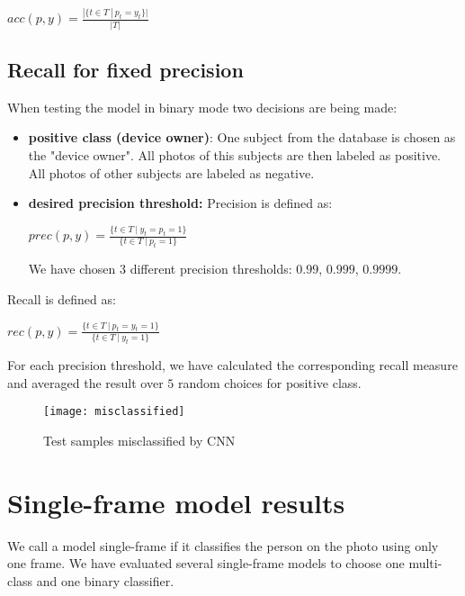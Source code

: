         \begin{center}
        $acc(p, y) = \frac{|\{t \in T\ |\ p_t = y_t\}|}{|T|}$
        \end{center}

        \subsection*{Recall for fixed precision}

        When testing the model in binary mode two decisions are being made:
        \begin{itemize}
            \item \textbf{positive class (device owner)}: One subject from the
            database is chosen as the "device owner". All photos of this subjects
            are then labeled as positive. All photos of other subjects are
            labeled as negative.
            \item \textbf{desired precision threshold:}
            Precision is defined as:
            \begin{center}
            $prec(p, y) = \frac{\{t \in T\ |\ y_t = p_t = 1\}}{\{t \in T\ |\ p_t = 1\}}$
            \end{center}
            We have chosen $3$ different precision thresholds: $0.99$, $0.999$, $0.9999$.
        \end{itemize}
        Recall is defined as:
        \begin{center}
        $rec(p, y) = \frac{\{t \in T\ |\ p_t = y_t = 1\}}{\{t \in T\ |\ y_t = 1\}}$
        \end{center}
        For each precision threshold, we have calculated the corresponding recall measure and
        averaged the result over $5$ random choices for positive class.

    \begin{figure}[H]
    \caption{Test samples misclassified by CNN}
    \centering
    \texttt{[image: misclassified]}
    \end{figure}


    \section{Single-frame model results}
        We call a model single-frame if it classifies the person on the photo
        using only one frame. We have evaluated several single-frame models to
        choose one multi-class and one binary classifier.
